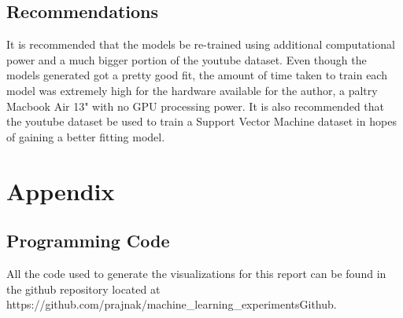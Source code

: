 \documentclass[letterpaper,12pt,titlepage,oneside,final]{report}
\newcommand{\href}[1]{#1} %
\begin{document}
    \section{Recommendations}
        It is recommended that the models be re-trained using additional computational power and a much bigger portion of the youtube dataset. Even though the models generated got a pretty good fit, the amount of time taken to train each model was extremely high for the hardware available for the author, a paltry Macbook Air 13" with no GPU processing power. It is also recommended that the youtube dataset be used to train a Support Vector Machine dataset in hopes of gaining a better fitting model.

\appendix
\chapter{Appendix}
    \section{Programming Code}
        \label{rcode}
        All the code used to generate the visualizations for this report can be found in the github repository located at \href{https://github.com/prajnak/machine_learning_experiments}{Github}.
\end{document}
